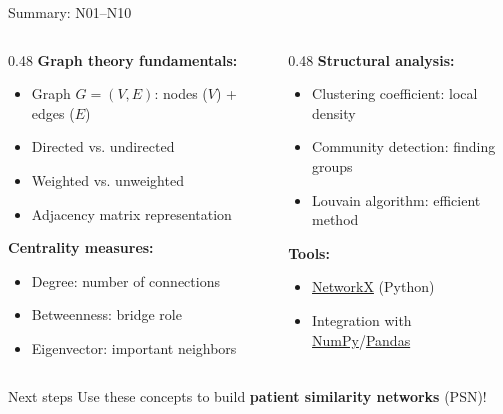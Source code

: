 \documentclass[aspectratio=169, 10pt]{beamer}
\begin{document}
\begin{frame}{Summary: N01--N10}
    
    \begin{columns}
        \begin{column}{0.48\textwidth}
            \textbf{Graph theory fundamentals:}
            \begin{itemize}
                \item Graph $G = (V, E)$: nodes ($V$) + edges ($E$)
                \item Directed vs. undirected
                \item Weighted vs. unweighted
                \item Adjacency matrix representation
            \end{itemize}
            
            \vspace{3mm}
            
            \textbf{Centrality measures:}
            \begin{itemize}
                \item Degree: number of connections
                \item Betweenness: bridge role
                \item Eigenvector: important neighbors
            \end{itemize}
        \end{column}
        
        \begin{column}{0.48\textwidth}
            \textbf{Structural analysis:}
            \begin{itemize}
                \item Clustering coefficient: local density
                \item Community detection: finding groups
                \item Louvain algorithm: efficient method
            \end{itemize}
            
            \vspace{3mm}
            
            \textbf{Tools:}
            \begin{itemize}
                \item \href{https://networkx.org/}{NetworkX} (Python)
                \item Integration with \href{https://numpy.org/}{NumPy}/\href{https://pandas.pydata.org/}{Pandas}
            \end{itemize}
        \end{column}
    \end{columns}
    
    \vspace{5mm}
    
    \begin{block}{Next steps}
        Use these concepts to build \textbf{patient similarity networks} (PSN)!
    \end{block}
    
\end{frame}
\end{document}
